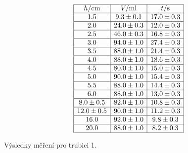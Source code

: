 \documentclass[a4paper,12pt]{article}
\begin{document}
\begin{table}
$$
\begin{array}{|c|c|c|}
\hline
h/\mbox{cm}&	V/\mbox{ml}&	t/\mbox{s}	\\ \hline
1.5&	9.3 \pm 0.1&	17.0\pm 0.3\\ \hline
2.0&	24.0 \pm 0.3&	12.0\pm 0.3\\ \hline
2.5&	46.0 \pm 0.3&	16.8\pm 0.3\\ \hline
3.0&	94.0 \pm 1.0&	27.4\pm 0.3\\ \hline
3.5&	88.0 \pm 1.0&	21.4\pm 0.3\\ \hline
4.0&	88.0 \pm 1.0 &	18.6\pm 0.3\\ \hline
4.5&	80.0\pm 1.0&	15.0\pm 0.3\\ \hline
5.0&	90.0\pm 1.0&	15.4\pm 0.3\\ \hline
5.5&	88.0\pm 1.0&	14.4\pm 0.3\\ \hline
6.0&	88.0\pm 1.0&	13.0\pm 0.3\\ \hline
8.0 \pm 0.5&	82.0\pm 1.0&	10.8\pm 0.3\\ \hline
12.0 \pm 0.5&	90.0\pm 1.0&	11.2\pm 0.3\\ \hline
16.0&	92.0\pm 1.0&	9.8\pm 0.3\\ \hline
20.0&	88.0\pm 1.0&	8.2\pm 0.3\\ \hline
\end{array}
$$
\caption{Výsledky měření pro trubici 1.}
\label{T1}
\end{table}
\end{document}
